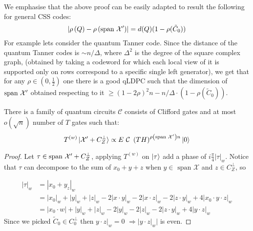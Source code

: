 \documentclass[manuscript,screen,review]{acmart}
\begin{document}
\begin{remark}
  We emphasise that the above proof can be easily adapted to result the following for general CSS codes: 
\begin{equation*}
    \begin{split}
      \left| \rho\left(Q\right) - \rho\left(\text{span }\mathcal{X}^\prime\right) \right| = d(Q)(1 - \rho(\tilde{C}_{0}))
    \end{split}
  \end{equation*}
  For example lets consider the quantum Tanner code. Since the distance of the quantum Tanner codes is $\sim n/\Delta$, where $\Delta^{2}$ is the degree of the square complex graph, (obtained by taking a codeword for which each local view of it is supported only on rows correspond to a specific single left generator), we get that for any $\rho \in (0,\frac{1}{2})$ one there is a good qLDPC such that the dimension of $\text{span }\mathcal{X}^\prime$ obtained respecting to it $\ge (1-2\rho)^{2}n - n/\Delta \cdot (1 - \rho(\tilde{C}_{0}))$.  
\end{remark}

\begin{claim}
  There is a family of quantum circuits $\mathcal{C}$ consists of Clifford gates and at most $o(\sqrt{n})$ number of $T$ gates such that: 
  \begin{equation*}
    \begin{split}
      T^{(w)}\ket{\Mbas + C_{Z}^{\perp}} \propto E \ \mathcal{C} \ \left(TH\right)^{\rho\left(\sMbas\right)n} \ket{0} 
    \end{split}
  \end{equation*}
\end{claim}
\begin{proof}
  Let $\tau \in \text{span }\mathcal{X}^\prime + C_{Z}^\perp$, applying $T^{(w)}$ on $\ket{\tau}$ add a phase of $i\frac{\pi}{4}\left|\tau\right|_{w}$. Notice that $\tau$ can decompose to the sum of  $x_{0} + y + z$ when $y \in \text{ span } \mathcal{X}$ and $z\in C_{Z}^{\perp}$, so 

  \begin{equation*}
    \begin{split}
  \left|\tau\right|_{w} &= \left| x_{0} + y _ z  \right|_{w} \\
  &= |x_{0}|_{w} + |y|_{w} +|z|_{w} - 2| x \cdot y |_{w} - 2| x \cdot z |_{w} -2| z \cdot y |_{w} + 4|x_{0}\cdot y \cdot z|_{w}  \\
  &= |x_{0} \cdot w| + |y|_{w} +|z|_{w} - 2|y|_{w} - 2|z|_{w} -2| z \cdot y |_{w} + 4|y \cdot z|_{w}  
    \end{split}
  \end{equation*}
  Since we picked $\tilde{C}_{0} \in C_{0}^{\perp}$ then $y \cdot z|_{w} = 0$ $\Rightarrow |y \cdot z|_{w}|$ is even.
\end{proof}





%

\printbibliography
\end{document}
